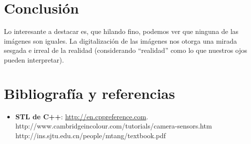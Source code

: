 \section{Conclusión}

Lo interesante a destacar es, que hilando fino, podemos ver que ninguna de las imágenes son iguales. La digitalización de las imágenes nos otorga una mirada sesgada e irreal de la realidad (considerando ``realidad'' como lo que nuestros ojos pueden interpretar).

\section{Bibliografía y referencias} %

\begin{itemize}
	\item \textbf{STL de C++}: \url{http://en.cppreference.com}.
http://www.cambridgeincolour.com/tutorials/camera-sensors.htm
http://ins.sjtu.edu.cn/people/mtang/textbook.pdf
\end{itemize}



